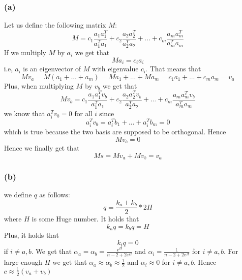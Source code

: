 \subsubsection*{(a)}
Let us define the following matrix $M$:
$$M=c_1 \frac{a_1 a_1^T}{a_1^T a_1} + c_2 \frac{a_2 a_2^T}{a_2^T a_2} + \dots + c_m \frac{a_m a_m^T}{a_m^T a_m}$$
If we multiply $M$ by $a_i$ we get that 
$$Ma_i = c_i a_i$$
i.e, $a_i$ is an eigenvector of $M$ with eigenvalue $c_i$. That means that 
$$Mv_a = M(a_1+ \dots + a_m) = Ma_1+ \dots + Ma_m=c_1a_1+ \dots +c_ma_m=v_a$$
Plus, when multiplying $M$ by $v_b$ we get that
$$Mv_b = c_1 \frac{a_1 a_1^T v_b}{a_1^T a_1} + c_2 \frac{a_2 a_2^T v_b}{a_2^T a_2} + \dots + c_m \frac{a_m a_m^T v_b}{a_m^T a_m}$$
we know that $a_i^T v_b = 0$ for all $i$ since 
$$a_i^T v_b = a_i^T b_1 + ... + a_i^T b_m = 0$$
which is true because the two basis are supposed to be orthogonal. Hence
$$Mv_b = 0$$
Hence we finally get that $$Ms=Mv_a+Mv_b=v_a$$ \newline
\subsubsection*{(b)}
we define $q$ as follows:
$$q = \frac{k_a + k_b}{2}*2H$$ where $H$ is some Huge number. It holds that 
$$k_a q = k_b q = H$$
Plus, it holds that 
$$ k_i q = 0 $$ if $i \neq a,b$. We get that $\alpha_a = \alpha_b = \frac{e^H}{n-2 + 2e^H}$ and $\alpha_i=\frac{1}{n-2 + 2e^H}$ for $i \neq a,b$. \newline
For large enough $H$ we get that $\alpha_a \approx \alpha_b \approx \frac{1}{2}$ and $\alpha_i \approx 0$ for $i \neq a,b$. Hence $c \approx \frac{1}{2}(v_a + v_b)$